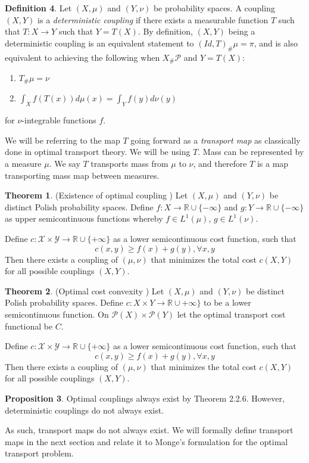 \documentclass{Dissertate}
\theoremstyle{definition}
\newtheorem{theorem}{Theorem}[section]
\newtheorem{proposition}[theorem]{Proposition}
\theoremstyle{definition} %
\theoremstyle{definition}
\newtheorem{definition}[theorem]{Definition}
\begin{document}
\begin{definition}
Let $(X, \mu)$ and $(Y, \nu)$ be probability spaces. A coupling $(X,Y)$ is a \textit{deterministic coupling} if there exists a measurable function $T$ such that $T: X \rightarrow Y$ such that $Y = T(X)$. By definition, $(X,Y)$ being a deterministic coupling is an equivalent statement to $(Id, T)_{\#}\mu = \pi$, and is also equivalent to achieving the following when $X_{\#}\mathcal{P}$ and $Y = T(X)$: 
\begin{enumerate}
    \item $T_{\#} \mu = \nu$ 
    \item $\int_X f(T(x))d\mu(x)  = \int_Y f(y)d\nu(y)$
\end{enumerate}
for $\nu$-integrable functions $f$.

We will be referring to the map $T$ going forward as a \textit{transport map} as classically done in optimal transport theory. We will be using $T$. Mass can be represented by a measure $\mu$. We say $T$ transports mass from $\mu$ to $\nu$, and therefore $T$ is a map transporting mass map between measures. 
\begin{theorem} (Existence of optimal coupling \cite{VillaniCedric2009Ot:o})
Let $(X, \mu)$ and $(Y, \nu)$ be distinct Polish probability spaces. Define
$f : X \to \mathbb{R} \cup \{-\infty\}$ and
$g : Y \to \mathbb{R} \cup \{-\infty\}$ as upper semicontinuous functions whereby $f \in L^1(\mu)$, $g \in L^1(\nu)$.

Define $c : \mathcal{X} \times \mathcal{Y} \to \mathbb{R} \cup \{+\infty\}$ 
as a lower semicontinuous cost function, such that 
$$c(x,y) \geq f(x) + g(y), \forall x, y$$ Then there exists a coupling of $(\mu, \nu)$ that minimizes the total cost  $c(X,Y)$ for all possible couplings $(X,Y)$.
\end{theorem}
\begin{theorem} (Optimal cost convexity \cite{VillaniCedric2009Ot:o})
Let $(X, \mu)$ and $(Y, \nu)$ be distinct Polish probability spaces. Define
$c : X \times Y \rightarrow \mathbb{R} \cup +\infty\}$ to be a lower semicontinuous function. On $\mathcal{P}(X) \times \mathcal{P}(Y)$ let the optimal transport cost functional be $C$.

Define $c : \mathcal{X} \times \mathcal{Y} \to \mathbb{R} \cup \{+\infty\}$ 
as a lower semicontinuous cost function, such that 
$$c(x,y) \geq f(x) + g(y), \forall x, y$$ Then there exists a coupling of $(\mu, \nu)$ that minimizes the total cost  $c(X,Y)$ for all possible couplings $(X,Y)$.
\end{theorem}
\begin{proposition}
Optimal couplings always exist by Theorem 2.2.6. However, deterministic couplings do not always exist. \cite{VillaniCedric2009Ot:o}
\end{proposition}
As such, transport maps do not always exist. We will formally define transport maps in the next section and relate it to Monge's formulation for the optimal transport problem.
\end{definition}
\end{document}
